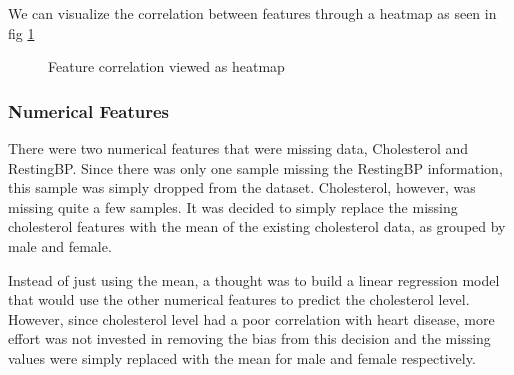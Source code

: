 \documentclass[12pt,conference]{IEEEtran}
\begin{document}
We can visualize the correlation between features through a heatmap as seen in fig \ref{fig:one-hot-heatmap}

\begin{figure}%
    \centering
    \qquad
    \caption{Feature correlation viewed as heatmap}%
    \label{fig:one-hot-heatmap}%
\end{figure}

\subsubsection{Numerical Features}
There were two numerical features that were missing data, Cholesterol and RestingBP. Since there was only one sample missing the RestingBP information, this sample was simply dropped from the dataset. Cholesterol, however, was missing quite a few samples. It was decided to simply replace the missing cholesterol features with the mean of the existing cholesterol data, as grouped by male and female. 

Instead of just using the mean, a thought was to build a linear regression model that would use the other numerical features to predict the cholesterol level. However, since cholesterol level had a poor correlation with heart disease, more effort was not invested in removing the bias from this decision and the missing values were simply replaced with the mean for male and female respectively.
\end{document}

